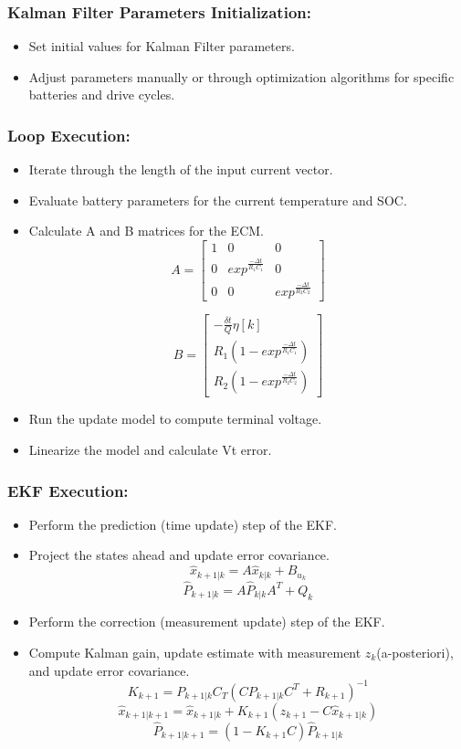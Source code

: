 \documentclass[conference]{IEEEtran}
\begin{document}
\subsubsection{Kalman Filter Parameters Initialization:}
\begin{itemize}
  \item Set initial values for Kalman Filter parameters.
  \item Adjust parameters manually or through optimization algorithms for specific batteries and drive cycles.
\end{itemize}

\subsubsection{Loop Execution:}
\begin{itemize}
  \item Iterate through the length of the input current vector.
  \item Evaluate battery parameters for the current temperature and SOC.
  \item Calculate A and B matrices for the ECM.
  \[ A = 
\begin{bmatrix}
    1 & 0 & 0 \\
    0 & exp^{\frac{-\Delta t}{R_1C_1}} & 0 \\
    0 & 0 & exp^{\frac{-\Delta t}{R_2C_2}}
\end{bmatrix}
\]

\[ B = 
\begin{bmatrix}
    -\frac{\delta t}{Q}\eta[k]\\
    R_1(1-exp^{\frac{-\Delta t}{R_1C_1}}) \\
    R_2(1-exp^{\frac{-\Delta t}{R_2C_2}})
\end{bmatrix}
\]
  \item Run the update model to compute terminal voltage.
  \item Linearize the model and calculate Vt error.
\end{itemize}

\subsubsection{EKF Execution:}
\begin{itemize}
  \item Perform the prediction (time update) step of the EKF.
  \item Project the states ahead and update error covariance.
  $${\hat{x}_{k+1|k} = A\hat{x}_{k|k} + B_{u_k}}$$
  $${\hat{P}_{k+1|k} = A\hat{P}_{k|k}A^T + Q_{k}}$$
  \item Perform the correction (measurement update) step of the EKF.
  \item Compute Kalman gain, update estimate with measurement $z_k$(a-posteriori), and update error covariance.
  $${K_{k+1} = P_{k+1|k}C_T(CP_{k+1|k}C^T+R_{k+1})^{-1}}$$
  $${\hat{x}_{k+1|k+1} = \hat{x}_{k+1|k} + K_{k+1}(z_{k+1} - C\hat{x}_{k+1|k})}$$
  $${\hat{P}_{k+1|k+1} = (1-K_{k+1}C)\hat{P}_{k+1|k} }$$
\end{itemize}
\end{document}
